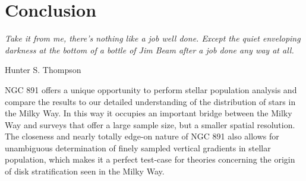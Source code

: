 \chapter[Conclusion]{Conclusion}
\label{chap:conclusion}
\epigraph{\fixspacing\emph{Take it from me, there's nothing like a job
    well done. Except the quiet enveloping darkness at the bottom of a
    bottle of Jim Beam after a job done any way at all.}}{Hunter
    S. Thompson}



\cleardoublepage

NGC 891 offers a unique opportunity to perform stellar population
analysis and compare the results to our detailed understanding of the
distribution of stars in the Milky Way. In this way it occupies an
important bridge between the Milky Way and surveys that offer a large
sample size, but a smaller spatial resolution. The closeness and
nearly totally edge-on nature of NGC 891 also allows for unambiguous
determination of finely sampled vertical gradients in stellar
population, which makes it a perfect test-case for theories concerning
the origin of disk stratification seen in the Milky Way.

